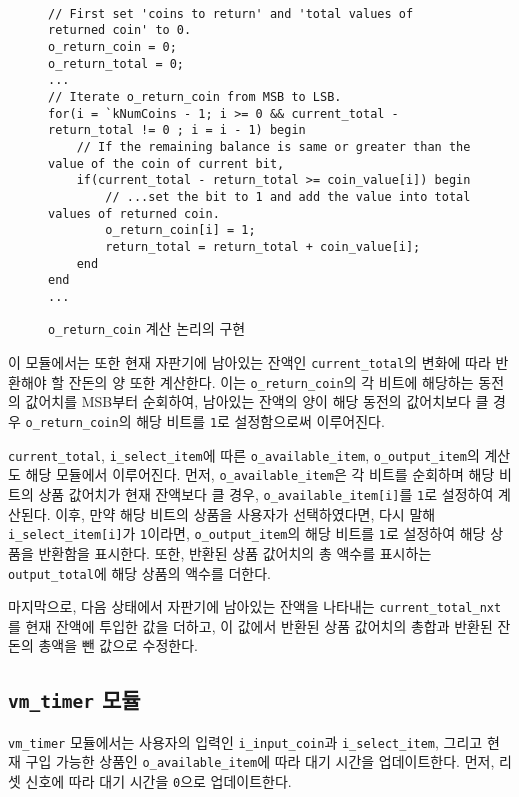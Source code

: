 \documentclass[openright, a4paper]{article}
\newcommand{\code}[1]{\texttt{#1}}
\begin{document}
\hfill \break
\begin{figure}[h]
    \begin{verbatim}

// First set 'coins to return' and 'total values of returned coin' to 0.
o_return_coin = 0;
o_return_total = 0;
...
// Iterate o_return_coin from MSB to LSB.
for(i = `kNumCoins - 1; i >= 0 && current_total - return_total != 0 ; i = i - 1) begin
    // If the remaining balance is same or greater than the value of the coin of current bit,
    if(current_total - return_total >= coin_value[i]) begin
        // ...set the bit to 1 and add the value into total values of returned coin.
        o_return_coin[i] = 1;
        return_total = return_total + coin_value[i];
    end
end
...
    \end{verbatim}
    \caption{\code{o_return_coin} 계산 논리의 구현}
\end{figure}
\hfill \break

이 모듈에서는 또한 현재 자판기에 남아있는 잔액인 \code{current_total}의 변화에 따라 반환해야 할 잔돈의 양 또한 계산한다.
이는 \code{o_return_coin}의 각 비트에 해당하는 동전의 값어치를 MSB부터 순회하여, 남아있는 잔액의 양이 해당 동전의 값어치보다 클 경우
\code{o_return_coin}의 해당 비트를 \code{1}로 설정함으로써 이루어진다.

\code{current_total}, \code{i_select_item}에 따른 \code{o_available_item}, \code{o_output_item}의 계산도 해당 모듈에서 이루어진다. 
먼저, \code{o_available_item}은 각 비트를 순회하며 해당 비트의 상품 값어치가 현재 잔액보다 클 경우, \code{o_available_item[i]}를
\code{1}로 설정하여 계산된다. 이후, 만약 해당 비트의 상품을 사용자가 선택하였다면, 다시 말해 \code{i_select_item[i]}가
\code{1}이라면, \code{o_output_item}의 해당 비트를 \code{1}로 설정하여 해당 상품을 반환함을 표시한다. 또한, 반환된 상품 값어치의
총 액수를 표시하는 \code{output_total}에 해당 상품의 액수를 더한다.

마지막으로, 다음 상태에서 자판기에 남아있는 잔액을 나타내는 \code{current_total_nxt}를 현재 잔액에 투입한 값을 더하고, 이 값에서 
반환된 상품 값어치의 총합과 반환된 잔돈의 총액을 뺀 값으로 수정한다.

\subsection{\code{vm_timer} 모듈}
\code{vm_timer} 모듈에서는 사용자의 입력인 \code{i_input_coin}과 \code{i_select_item}, 그리고 현재 구입 가능한 상품인 
\code{o_available_item}에 따라 대기 시간을 업데이트한다. 먼저, 리셋 신호에 따라 대기 시간을 \code{0}으로 업데이트한다.
\end{document}

